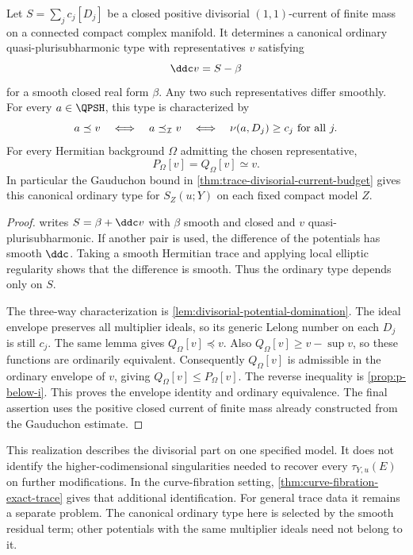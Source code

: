 \begin{corollary}\label{cor:divisorial-current-ordinary-type}
Let $S=\sum_jc_j[D_j]$ be a closed positive divisorial $(1,1)$-current of finite mass on a connected compact complex manifold. It determines a canonical ordinary quasi-plurisubharmonic type with representatives $v$ satisfying
\[
 \ddc v=S-\beta
\]
for a smooth closed real form $\beta$. Any two such representatives differ smoothly. For every $a\in\QPSH$, this type is characterized by
\[
 a\preceq v\quad\Longleftrightarrow\quad
 a\preceq_{\mathcal I}v\quad\Longleftrightarrow\quad
 \nu(a,D_j)\geq c_j\ \hbox{for all }j.
\]
For every Hermitian background $\Omega$ admitting the chosen representative,
\[
 P_\Omega[v]=Q_\Omega[v]\simeq v.
\]
In particular the Gauduchon bound in \cref{thm:trace-divisorial-current-budget} gives this canonical ordinary type for $S_Z(u;Y)$ on each fixed compact model $Z$.
\end{corollary}
\begin{proof}
 writes $S=\beta+\ddc v$ with $\beta$ smooth and closed and $v$ quasi-plurisubharmonic. If another pair is used, the difference of the potentials has smooth $\ddc$. Taking a smooth Hermitian trace and applying local elliptic regularity shows that the difference is smooth. Thus the ordinary type depends only on $S$.

The three-way characterization is \cref{lem:divisorial-potential-domination}. The ideal envelope preserves all multiplier ideals, so its generic Lelong number on each $D_j$ is still $c_j$. The same lemma gives $Q_\Omega[v]\preceq v$. Also $Q_\Omega[v]\geq v-\sup v$, so these functions are ordinarily equivalent. Consequently $Q_\Omega[v]$ is admissible in the ordinary envelope of $v$, giving $Q_\Omega[v]\leq P_\Omega[v]$. The reverse inequality is \cref{prop:p-below-i}. This proves the envelope identity and ordinary equivalence. The final assertion uses the positive closed current of finite mass already constructed from the Gauduchon estimate.
\end{proof}

This realization describes the divisorial part on one specified model. It does not identify the higher-codimensional singularities needed to recover every $\tau_{Y,u}(E)$ on further modifications. In the curve-fibration setting, \cref{thm:curve-fibration-exact-trace} gives that additional identification. For general trace data it remains a separate problem. The canonical ordinary type here is selected by the smooth residual term; other potentials with the same multiplier ideals need not belong to it.

